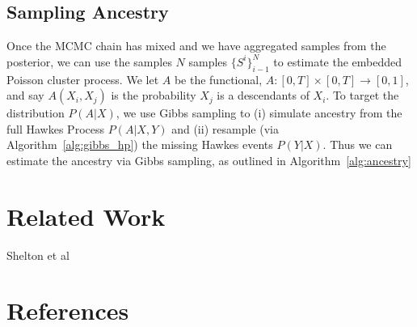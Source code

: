 \documentclass[11pt]{article}
\newcommand{\algrule}[1][.2pt]{\par\vskip.5\baselineskip\hrule height #1\par\vskip.5\baselineskip}
\begin{document}
\subsection{Sampling Ancestry}

Once the MCMC chain has mixed and we have aggregated samples from the posterior, we can use the samples $N$ samples $\{S^i\}_{i-1}^N$ to estimate the embedded Poisson cluster process. We let $A$ be the functional, $A:[0,T]\times[0,T] \to [0,1]$, and say $A(X_i,X_j) $ is the probability $X_j$ is a descendants of $X_i$. To target the distribution $P(A | X)$, we use Gibbs sampling to (i) simulate ancestry from the full Hawkes Process $P(A | X, Y)$ and (ii) resample (via Algorithm~\ref{alg:gibbs_hp}) the missing Hawkes events $P(Y | X)$. Thus we can estimate the ancestry via Gibbs sampling, as outlined in Algorithm~\ref{alg:ancestry}








\newpage
\section*{Related Work}

Shelton et al~\cite{AAAI1816985}


\newpage
\section*{References}


\end{document}
